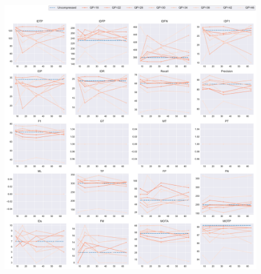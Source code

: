 \begin{figure}[!htbp]
\centering
\includegraphics[width=1.0\linewidth]{img/appendix/Cactus_all_multiplots_msr.pdf}
\caption[Result of all object classes in Class B Cactus with Horizontal Axis of MSR]{}
\label{fig:Cactus_all_msr}
\end{figure}




